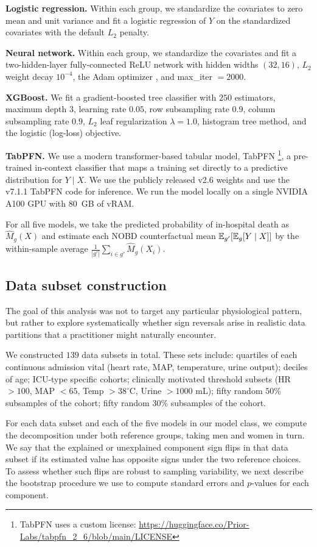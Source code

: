 \textbf{Logistic regression.} Within each group, we standardize the covariates to zero mean and unit variance and fit a logistic regression of $Y$ on the standardized covariates with the default $L_2$ penalty.

\textbf{Neural network.} Within each group, we standardize the covariates and fit a two-hidden-layer fully-connected ReLU network with hidden widths $(32, 16)$, $L_2$ weight decay $10^{-4}$, the Adam optimizer \citep{kingma2015adam}, and max\_iter $=2000$.

\textbf{XGBoost.} We fit a gradient-boosted tree classifier with $250$ estimators, maximum depth $3$, learning rate $0.05$, row subsampling rate $0.9$, column subsampling rate $0.9$, $L_2$ leaf regularization $\lambda = 1.0$, histogram tree method, and the logistic (log-loss) objective.

\textbf{TabPFN.} We use a modern transformer-based tabular model, TabPFN \citep{hollmann2023tabpfn}\footnote{TabPFN uses a custom license: \url{https://huggingface.co/Prior-Labs/tabpfn_2_6/blob/main/LICENSE}}, a pre-trained in-context classifier that maps a training set directly to a predictive distribution for $Y \mid X$. We use the publicly released v2.6 weights and use the v7.1.1 TabPFN code for inference. We run the model locally on a single NVIDIA A100 GPU with $80$~GB of vRAM.

For all five models, we take the predicted probability of in-hospital death as $\hat{M}_g(X)$ and estimate each NOBD counterfactual mean $\mathbb{E}_{g'}[\mathbb{E}_g[Y \mid X]]$ by the within-sample average $\frac{1}{|g'|}\sum_{i \in g'} \hat{M}_g(X_i)$.

\subsection*{Data subset construction}
The goal of this analysis was not to target any particular physiological pattern, but rather to explore systematically whether sign reversals arise in realistic data partitions that a practitioner might naturally encounter.

We constructed $139$ data subsets in total. These sets include: quartiles of each continuous admission vital (heart rate, MAP, temperature, urine output);
deciles of age; ICU-type specific cohorts; clinically motivated threshold subsets (HR $>100$, MAP $<65$, Temp $> 38^\circ$C, Urine $>1000$ mL); fifty random $50\%$ subsamples of the cohort; fifty random $30\%$ subsamples of the cohort.

For each data subset and each of the five models in our model class, we compute the decomposition under both reference groups, taking men and women in turn. We say that the explained or unexplained component sign flips in that data subset if its estimated value has opposite signs under the two reference choices. To assess whether such flips are robust to sampling variability, we next describe the bootstrap procedure we use to compute standard errors and $p$-values for each component.

